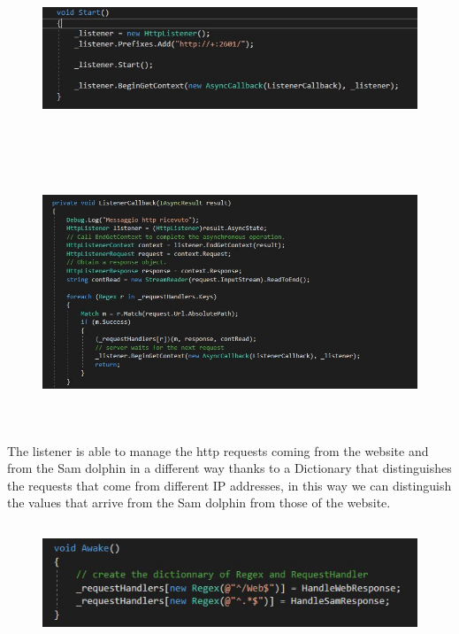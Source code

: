 \documentclass [12pt]{article}
\begin{document}
\begin{itemize}[•]
\begin{figure}[ht!]
\centering
\includegraphics[height=5cm,width=16cm]{StartServer.jpg}
\end{figure}

\begin{figure}[ht!]
\centering
\includegraphics[height=8cm,width=16cm]{ReadRequest.jpg}
\end{figure}
The listener is able to manage the http requests coming from the website and from the Sam dolphin in a different way thanks to a Dictionary that distinguishes the requests that come from different IP addresses, in this way we can distinguish the values that arrive from the Sam dolphin from those of the website.\\

\begin{figure}[ht!]
\centering
\includegraphics[height=3.5cm,width=14cm]{Dictionary.jpg}
\end{figure}



\end{itemize}
\end{document}
